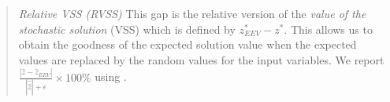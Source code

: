\begin{quote}
	\noindent\textit{Relative VSS (RVSS)} This gap is the relative version of the \textit{value of the stochastic solution} (VSS) which is defined by $z^*_{EEV}-z^*$. This allows us to obtain the goodness of the expected solution value when the expected values are replaced by the random values for the input variables. We report $\frac{|\hat{z}-\hat{z}_{EEV}|}{|\hat{\hat{z}}|+\epsilon}\times 100\%$ using \cplex.
\end{quote}





